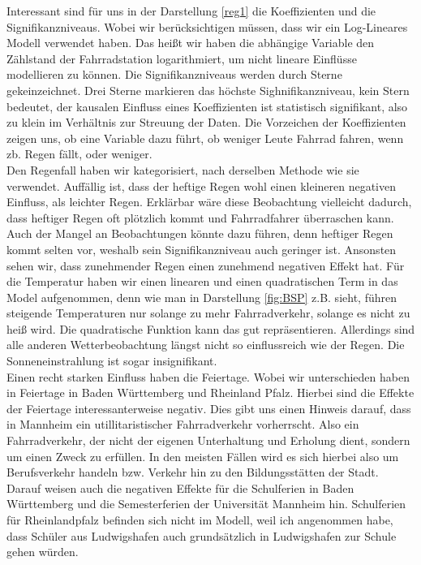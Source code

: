 \documentclass[a4paper,12pt]{thesis}
\begin{document}
Interessant sind für uns in der Darstellung \ref{reg1} die Koeffizienten und die Signifikanzniveaus. Wobei wir berücksichtigen müssen, dass wir ein Log-Lineares Modell verwendet haben. Das heißt wir haben die abhängige Variable den Zählstand der Fahrradstation logarithmiert, um nicht lineare Einflüsse modellieren zu können. Die Signifikanzniveaus werden durch Sterne gekeinzeichnet. Drei Sterne markieren das höchste Sighnifikanzniveau, kein Stern bedeutet, der kausalen Einfluss eines Koeffizienten ist statistisch signifikant, also zu klein im Verhältnis zur Streuung der Daten. Die Vorzeichen der Koeffizienten zeigen uns, ob eine Variable dazu führt, ob weniger Leute Fahrrad fahren, wenn zb. Regen fällt, oder weniger.\\ 
Den Regenfall haben wir kategorisiert, nach derselben Methode wie sie \cite{Wessel2020} verwendet. Auffällig ist, dass der heftige Regen wohl einen kleineren negativen Einfluss, als leichter Regen. Erklärbar wäre diese Beobachtung vielleicht dadurch, dass heftiger Regen oft plötzlich kommt und Fahrradfahrer überraschen kann. Auch der Mangel an Beobachtungen könnte dazu führen, denn heftiger Regen kommt selten vor, weshalb sein Signifikanzniveau auch geringer ist. Ansonsten sehen wir, dass zunehmender Regen einen zunehmend negativen Effekt hat. Für die Temperatur haben wir einen linearen und einen quadratischen Term in das Model aufgenommen, denn wie man in Darstellung \ref{fig:BSP} z.B. sieht, führen steigende Temperaturen nur solange zu mehr Fahrradverkehr, solange es nicht zu heiß wird. Die quadratische Funktion kann das gut repräsentieren. Allerdings sind alle anderen Wetterbeobachtung längst nicht so einflussreich wie der Regen. Die Sonneneinstrahlung ist sogar insignifikant.\\
Einen recht starken Einfluss haben die Feiertage. Wobei wir unterschieden haben in Feiertage in Baden Württemberg und Rheinland Pfalz. Hierbei sind die Effekte der Feiertage interessanterweise negativ. Dies gibt uns einen Hinweis darauf, dass in Mannheim ein utillitaristischer Fahrradverkehr vorherrscht. Also ein Fahrradverkehr, der nicht der eigenen Unterhaltung und Erholung dient, sondern um einen Zweck zu erfüllen. In den meisten Fällen wird es sich hierbei also um Berufsverkehr handeln bzw. Verkehr hin zu den Bildungsstätten der Stadt. Darauf weisen auch die negativen Effekte für die Schulferien in Baden Württemberg und die Semesterferien der Universität Mannheim hin. Schulferien für Rheinlandpfalz befinden sich nicht im Modell, weil ich angenommen habe, dass Schüler aus Ludwigshafen auch grundsätzlich in Ludwigshafen zur Schule gehen würden.
\end{document}
